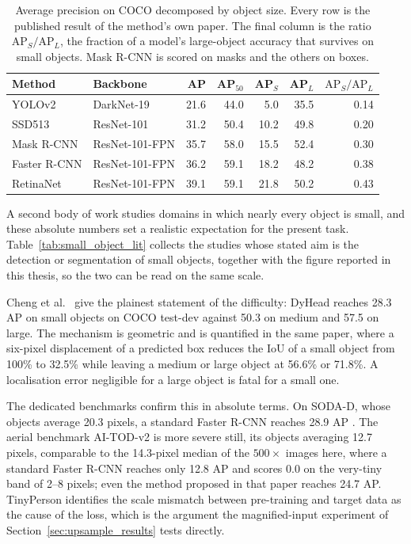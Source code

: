 \begin{table}[htbp]
    \centering

    \caption{Average precision on COCO decomposed by object size. Every row is the
    published result of the method's own paper. The final column is the ratio
    $\mathrm{AP}_S / \mathrm{AP}_L$, the fraction of a model's large-object
    accuracy that survives on small objects. Mask R-CNN is scored on masks and the
    others on boxes.}
    \label{tab:coco_size}
    \begin{tabular}{llrrrrr}
        \toprule
        Method & Backbone & AP & AP$_{50}$ & AP$_S$ & AP$_L$ & $\mathrm{AP}_S/\mathrm{AP}_L$ \\
        \midrule
        YOLOv2 \cite{redmon2016yolo, lin2020focal} & DarkNet-19 & 21.6 & 44.0 & 5.0  & 35.5 & 0.14 \\
        SSD513 \cite{lin2020focal}        & ResNet-101      & 31.2 & 50.4 & 10.2 & 49.8 & 0.20 \\
        Mask R-CNN \cite{he2017mask}      & ResNet-101-FPN  & 35.7 & 58.0 & 15.5 & 52.4 & 0.30 \\
        Faster R-CNN \cite{lin2020focal}  & ResNet-101-FPN  & 36.2 & 59.1 & 18.2 & 48.2 & 0.38 \\
        RetinaNet \cite{lin2020focal}     & ResNet-101-FPN  & 39.1 & 59.1 & 21.8 & 50.2 & 0.43 \\
        \bottomrule
    \end{tabular}
\end{table}

A second body of work studies domains in which nearly every object is small, and
these absolute numbers set a realistic expectation for the present task.
Table~\ref{tab:small_object_lit} collects the studies whose stated aim is the
detection or segmentation of small objects, together with the figure reported in
this thesis, so the two can be read on the same scale.

Cheng et al.\ \cite{cheng2023soda} give the plainest statement of the difficulty:
DyHead reaches 28.3 AP on small objects on COCO test-dev against 50.3 on medium
and 57.5 on large. The mechanism is geometric and is quantified in the same paper,
where a six-pixel displacement of a predicted box reduces the IoU of a small
object from 100\% to 32.5\% while leaving a medium or large object at 56.6\% or
71.8\%. A localisation error negligible for a large object is fatal for a small
one.

The dedicated benchmarks confirm this in absolute terms. On SODA-D, whose objects
average 20.3 pixels, a standard Faster R-CNN reaches 28.9 AP
\cite{cheng2023soda}. The aerial benchmark AI-TOD-v2 \cite{xu2022tiny} is more
severe still, its objects averaging 12.7 pixels, comparable to the 14.3-pixel
median of the $500\times$ images here, where a standard Faster R-CNN reaches
only 12.8 AP and scores 0.0 on the very-tiny band of 2--8 pixels; even the method
proposed in that paper reaches 24.7 AP. TinyPerson \cite{yu2020tinyperson}
identifies the scale mismatch between pre-training and target data as the cause of
the loss, which is the argument the magnified-input experiment of
Section~\ref{sec:upsample_results} tests directly.

